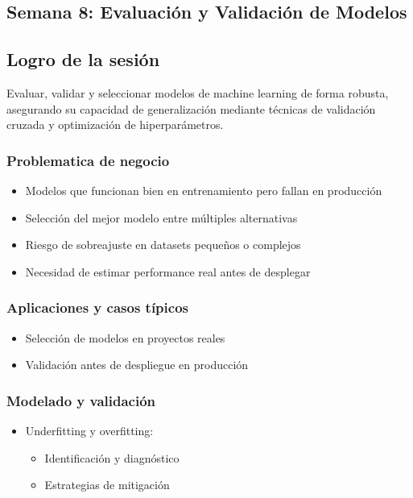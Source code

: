 \documentclass[12pt,a4paper,openany,oneside]{book}
\begin{document}
\begin{itemize}
\chapter{Semana 8: Evaluación y Validación de Modelos}

\section{Logro de la sesión}
Evaluar, validar y seleccionar modelos de machine learning de forma robusta, asegurando su capacidad de generalización mediante técnicas de validación cruzada y optimización de hiperparámetros.

\subsection{Problematica de negocio}
\begin{itemize}
    \item Modelos que funcionan bien en entrenamiento pero fallan en producción
    \item Selección del mejor modelo entre múltiples alternativas
    \item Riesgo de sobreajuste en datasets pequeños o complejos
    \item Necesidad de estimar performance real antes de desplegar
\end{itemize}

\subsection{Aplicaciones y casos típicos}
\begin{itemize}
    \item Selección de modelos en proyectos reales
    \item Validación antes de despliegue en producción
\end{itemize}

\subsection{Modelado y validación}
\begin{itemize}
    \item Underfitting y overfitting:
    \begin{itemize}
        \item Identificación y diagnóstico
        \item Estrategias de mitigación
    \end{itemize}


\end{itemize}
\end{itemize}
\end{document}
